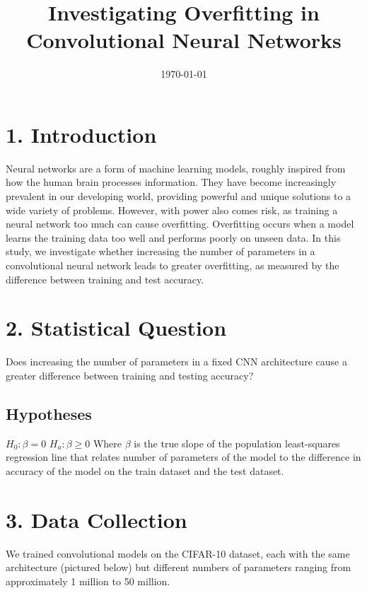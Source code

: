 \documentclass[12pt]{article}
\title{Investigating Overfitting in Convolutional Neural Networks}
\date{\today}
\begin{document}
    \maketitle

    \section*{1. Introduction}

    Neural networks are a form of machine learning models, roughly inspired from how the human brain processes information.
    They have become increasingly prevalent in our developing world, providing powerful and unique solutions to a wide variety of problems.
    However, with power also comes risk, as training a neural network too much can cause overfitting.
    Overfitting occurs when a model learns the training data too well and performs poorly on unseen data.
    In this study, we investigate whether increasing the number of parameters in a convolutional neural network
    leads to greater overfitting, as measured by the difference between training and test accuracy.

    \section*{2. Statistical Question}

    Does increasing the number of parameters in a fixed CNN architecture cause a greater difference between training and testing accuracy?

    \subsection*{Hypotheses}

    $H_0: \beta = 0$ \newline
    $H_a: \beta \geq 0$
    \newline \newline
    Where $\beta$ is the true slope of the population least-squares regression line that relates number of parameters of the model to the difference in accuracy of the model on the train dataset and the test dataset.

    \section*{3. Data Collection}

    We trained  convolutional models on the CIFAR-10 dataset, each with the same architecture (pictured below) but different numbers of
    parameters ranging from approximately 1 million to 50 million.
\end{document}
